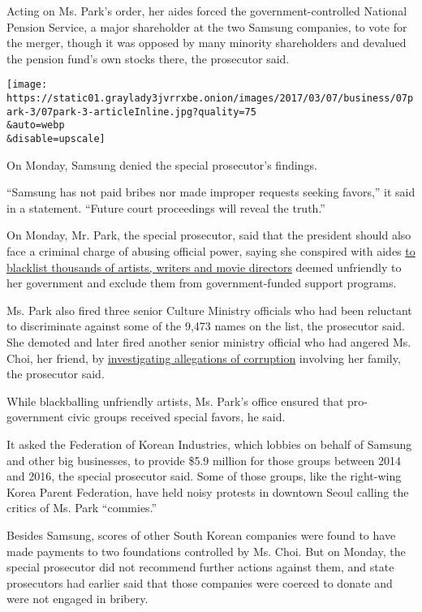 Acting on Ms. Park's order, her aides forced the government-controlled
National Pension Service, a major shareholder at the two Samsung
companies, to vote for the merger, though it was opposed by many
minority shareholders and devalued the pension fund's own stocks there,
the prosecutor said.

\texttt{[image: https://static01.graylady3jvrrxbe.onion/images/2017/03/07/business/07park-3/07park-3-articleInline.jpg?quality=75\\\&auto=webp\\\&disable=upscale]}

On Monday, Samsung denied the special prosecutor's findings.

``Samsung has not paid bribes nor made improper requests seeking
favors,'' it said in a statement. ``Future court proceedings will reveal
the truth.''

On Monday, Mr. Park, the special prosecutor, said that the president
should also face a criminal charge of abusing official power, saying she
conspired with aides
\href{https://www.nytimes3xbfgragh.onion/2017/01/12/world/asia/south-korea-president-park-blacklist-artists.html}{to
blacklist thousands of artists, writers and movie directors} deemed
unfriendly to her government and exclude them from government-funded
support programs.

Ms. Park also fired three senior Culture Ministry officials who had been
reluctant to discriminate against some of the 9,473 names on the list,
the prosecutor said. She demoted and later fired another senior ministry
official who had angered Ms. Choi, her friend, by
\href{https://www.nytimes3xbfgragh.onion/2016/11/12/world/asia/south-korea-park-geun-hye.html}{investigating
allegations of corruption} involving her family, the prosecutor said.

While blackballing unfriendly artists, Ms. Park's office ensured that
pro-government civic groups received special favors, he said.

It asked the Federation of Korean Industries, which lobbies on behalf of
Samsung and other big businesses, to provide \$5.9 million for those
groups between 2014 and 2016, the special prosecutor said. Some of those
groups, like the right-wing Korea Parent Federation, have held noisy
protests in downtown Seoul calling the critics of Ms. Park ``commies.''

Besides Samsung, scores of other South Korean companies were found to
have made payments to two foundations controlled by Ms. Choi. But on
Monday, the special prosecutor did not recommend further actions against
them, and state prosecutors had earlier said that those companies were
coerced to donate and were not engaged in bribery.

